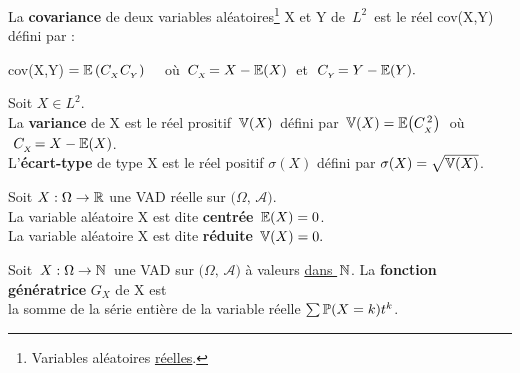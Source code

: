 \vspace{1.8cm}

La \textbf{covariance} de deux variables aléatoires\footnote{Variables aléatoires \underline{réelles}.} X et Y de \(\,L^2\,\) est le réel cov(X,Y) défini par :\vspace{0.1cm}

\hspace{3cm}cov(X,Y)\,\(\,=\mathbb{E}\,(C_{_X}C_{_Y})\quad \) où \(\:C_{_X}\!=X-\mathbb{E}(X)\;\) et \(\;C_{_Y}\!=Y-\mathbb{E}(Y).\)

\newpage

Soit \(X\in L^2\).\\
La \textbf{variance} de X est le réel prositif \(\,\mathbb{V}(X)\,\) défini par \(\,\mathbb{V}(X)=\mathbb{E}\bigl(C_{_X}^{\,2}\bigr)\;\) où \(\,\,C_{_X}\!=X-\mathbb{E}(X)\).\vspace{0.1cm}\\
L'\textbf{écart-type} de type X est le réel positif \(\sigma(X)\) défini par \(\sigma(X)=\sqrt{\mathbb{V}(X)}\).

\vspace{1.2cm}

Soit \(X:\Omega \to \mathbb{R}\) une VAD réelle sur \(\bigl(\Omega,\,\mathcal{A}\bigr)\).\\
La variable aléatoire X est dite \textbf{centrée} \ssi \(\,\mathbb{E}(X)=0\).\\
La variable aléatoire X est dite \textbf{réduite} \ssi \(\,\mathbb{V}(X)=0.\)

\vspace{1.3cm}

Soit \(\,X:\Omega \to \mathbb{N}\,\) une VAD sur \(\bigl(\Omega,\,\mathcal{A}\bigr)\) à valeurs \underline{dans \(\,\mathbb{N}\)}. La \textbf{fonction génératrice} \(G_X\) de X est\vspace{0.1cm}\\
la somme de la série entière de la variable réelle \(\sum \mathbb{P}(X=k)t^k\).

\vspace{2.3cm}

